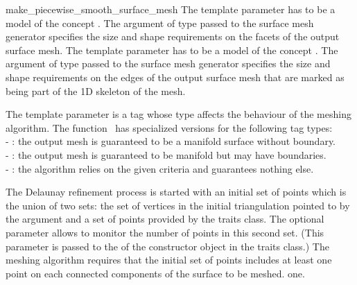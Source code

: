 \begin{ccRefFunction}{make_piecewise_smooth_surface_mesh}
The template parameter  has to be a model
of the concept .
The argument of type   passed to the surface
mesh generator specifies the size and shape  requirements on the facets of
the output surface mesh. The template parameter  has to be a model
of the concept .
The argument of type   passed to the surface
mesh generator specifies the size and shape requirements on the edges of
the output surface mesh that are marked as being part of the 1D skeleton of
the mesh.



The template parameter 
is a tag whose type affects the behaviour of the
meshing algorithm. The function \ccRefName\  has specialized versions
for the following  tag types: \\
- : the output mesh is guaranteed to be a manifold
surface without boundary.\\
- : the output mesh is guaranteed to be
manifold but may have boundaries.\\
- : the algorithm relies on the given criteria and
guarantees nothing else.



The Delaunay refinement
process is started with an initial set of points which is the union 
of two sets: the
set of vertices in the initial  triangulation pointed to by the
 argument   and a set of
points provided by the traits class.
The optional parameter  
allows to monitor the number of points in this second set.
(This parameter is passed to the  of 
the constructor object  
in the traits class.)
The meshing algorithm requires that the initial set of points
includes at least one point
on each connected components of the surface to be meshed.
one.


 



\ccSeeAlso
 \\
 \\
 \\
 \\
 \\
 \\



\end{ccRefFunction}
